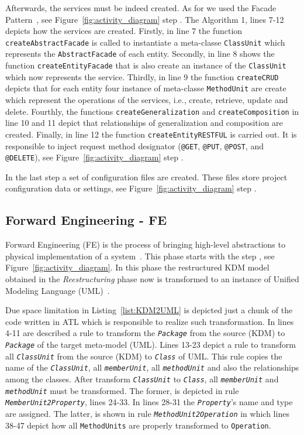 \documentclass[a4paper,twoside]{article}
\newcommand*\circled[1]{\tikz[baseline=(char.base)]{
  \node[shape=circle,draw, inner sep=0.1pt] (char) {#1};}
}
\begin{document}
Afterwards, the services must be indeed created. As for we used the Facade Pattern~\cite{Gamma1994}, see Figure~\ref{fig:activity_diagram} step \circled{\textbf{H}}. The Algorithm 1, lines 7-12 depicts how the services are created. Firstly, in line 7 the function \texttt{createAbstractFacade} is called to instantiate a meta-classe \texttt{ClassUnit} which represents the \texttt{AbstractFacade} of each entity. Secondly, in line 8 shows the function \texttt{createEntityFacade} that is also create an instance of the \texttt{ClassUnit} which now represents the service. Thirdly, in line 9 the function \texttt{createCRUD} depicts that for each entity four instance of meta-classe \texttt{MethodUnit} are create which represent the operations of the services, i.e., create, retrieve, update and delete. Fourthly, the functions \texttt{createGeneralization} and \texttt{createComposition} in line 10 and 11 depict that relationships of generalization and composition are created. Finally, in line 12 the function \texttt{createEntityRESTFUL} is carried out. It is responsible to inject request method designator (\texttt{@GET}, \texttt{@PUT}, \texttt{@POST}, and \texttt{@DELETE}), see Figure~\ref{fig:activity_diagram} step \circled{\textbf{I}}.

In the last step a set of configuration files are created. These files store project configuration data or settings, see Figure~\ref{fig:activity_diagram} step \circled{\textbf{J}}.

\subsection{Forward Engineering - FE} %
\label{sub:forward_engineering}

Forward Engineering (FE) is the process of bringing high-level abstractions to physical implementation of a system~\cite{Demeyer&al2002}. This phase starts with the step \circled{\textbf{K}}, see Figure~\ref{fig:activity_diagram}. In this phase the restructured KDM model obtained in the \textit{Reestructuring} phase now is transformed to an instance of Unified Modeling Language (UML)~\cite{OMG}. 


Due space limitation in Listing~\ref{list:KDM2UML} is depicted just a chunk of the code written in ATL which is responsible to realize such transformation. In lines 4-11 are described a rule to transform the \textit{\texttt{Package}} from the source (KDM) to \textit{\texttt{Package}} of the target meta-model (UML). Lines 13-23 depict a rule to transform all \textit{\texttt{ClassUnit}} from the source (KDM) to \textit{\texttt{Class}} of UML. This rule copies the name of the \textit{\texttt{ClassUnit}}, all \textit{\texttt{memberUnit}}, all \textit{\texttt{methodUnit}} and also the relationships among the classes. After transform \textit{\texttt{ClassUnit}} to \textit{\texttt{Class}}, all \textit{\texttt{memberUnit}} and \textit{\texttt{methodUnit}} must be transformed. The former, is depicted in rule \textit{\texttt{MemberUnit2Property}}, lines 24-33. In lines 28-31 the \textit{\texttt{Property}}'s name and type are assigned. The latter, is shown in rule \textit{\texttt{MethodUnit2Operation}} in which lines 38-47 depict how all \texttt{MethodUnits} are properly transformed to \texttt{Operation}.  
\end{document}
